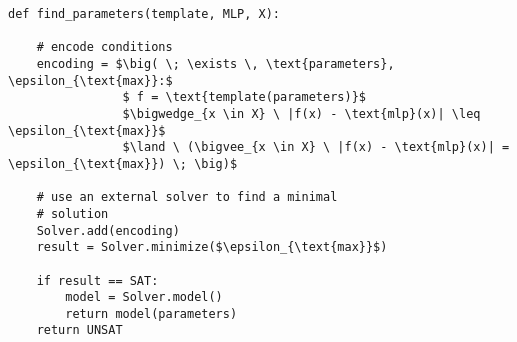 \begin{lstlisting}[caption={Finding parameters minimizing $\epsilon_{\text{max}}$.}, label=lst:smt_optimize, mathescape=true]
def find_parameters(template, MLP, X):

    # encode conditions
    encoding = $\big( \; \exists \, \text{parameters}, \epsilon_{\text{max}}:$
                $ f = \text{template(parameters)}$
                $\bigwedge_{x \in X} \ |f(x) - \text{mlp}(x)| \leq \epsilon_{\text{max}}$
                $\land \ (\bigvee_{x \in X} \ |f(x) - \text{mlp}(x)| = \epsilon_{\text{max}}) \; \big)$

    # use an external solver to find a minimal 
    # solution
    Solver.add(encoding)
    result = Solver.minimize($\epsilon_{\text{max}}$)

    if result == SAT:
        model = Solver.model()
        return model(parameters)
    return UNSAT
\end{lstlisting}